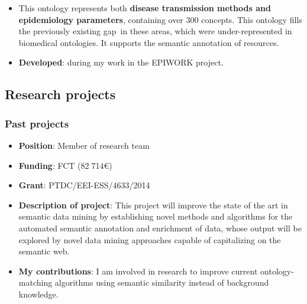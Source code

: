 \begin{itemize}
    \item This ontology represents both \textbf{disease transmission methods and epidemiology parameters}, containing over 300 concepts. This ontology fills the previously existing gap~in these areas, which were under-represented in biomedical ontologies. It supports the semantic annotation of resources.
    \item \textbf{Developed}: during my work in the EPIWORK project.
\end{itemize}


\subsection{Research projects}

\subsubsection{Past projects} \label{ss:past-projects}

\begin{itemize}
    \item \textbf{Position}: Member of research team
    \item \textbf{Funding}: FCT (82$\;$714€)
    \item \textbf{Grant}: PTDC/EEI-ESS/4633/2014
    \item \textbf{Description of project}: This project will improve the state of the art in semantic data mining by establishing novel methods and algorithms for the automated semantic annotation and enrichment of data, whose output will be explored by novel data mining approaches capable of capitalizing on the semantic web.
    \item \textbf{My contributions}: I am involved in research to improve current ontology-matching algorithms using semantic similarity instead of background knowledge.
\end{itemize}

